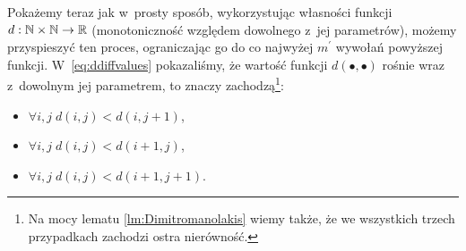 Pokażemy teraz jak w~prosty sposób, wykorzystując własności funkcji $d: \mathbb{N} \times \mathbb{N} \rightarrow \mathbb{R}$ (monotoniczność względem dowolnego z~jej parametrów), możemy przyspieszyć ten proces, ograniczając go do co najwyżej $m^{\prime}$ wywołań powyższej funkcji. 
W~\ref{eq:ddiffvalues} pokazaliśmy, że wartość funkcji $d \left( \bullet, \bullet \right)$ rośnie wraz z~dowolnym jej parametrem, to znaczy zachodzą\footnote{
	Na mocy lematu \ref{lm:Dimitromanolakis} wiemy także, że we wszystkich trzech przypadkach zachodzi ostra nierówność.
}:

\begin{itemize}
	\item $\forall i, j \; d \left( i, j \right) < d \left( i, j + 1 \right)$,
	\item $\forall i, j \; d \left( i, j \right) < d \left( i + 1, j \right)$,
	\item $\forall i, j \; d \left( i, j \right) < d \left( i + 1, j + 1 \right)$.
\end{itemize}

